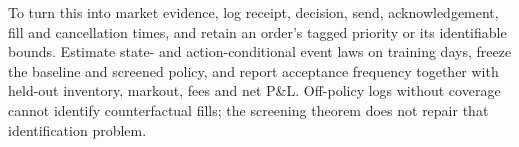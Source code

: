 To turn this into market evidence, log receipt, decision, send, acknowledgement,
fill and cancellation times, and retain an order's tagged priority or its
identifiable bounds. Estimate state- and action-conditional event laws on
training days, freeze the baseline and screened policy, and report acceptance
frequency together with held-out inventory, markout, fees and net P\&L.
Off-policy logs without coverage cannot identify counterfactual fills;
the screening theorem does not repair that identification problem.
